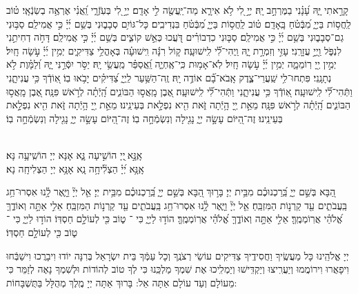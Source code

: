 \documentclass[twoside, openany, parskip=half, 11pt]{book}
\begin{document}
{
 קָרָ֣אתִי יָּ֑הּ עָ֝נָ֗נִי בַמֶּרְחָ֣ב יָֽהּ׃ 
יְיָ֣ לִ֭י לֹ֥א אִירָ֑א מַה־יַּֽעֲשֶׂ֖ה לִ֣י אָדָֽם׃ 
יְיָ֣ לִ֭י בְּעֹֽזְֿרָ֑י וַֽ֝אֲנִ֗י אֶרְאֶ֥ה בְשֽׂנְֿאָֽי׃ 
ט֗וֹב לַֽחֲס֥וֹת בַּיְיָ֑ מִ֝בְּֿטֹ֗חַ בָּֽאָדָֽם׃ 
ט֗וֹב לַֽחֲס֥וֹת בַּיְיָ֑ מִ֝בְּֿטֹ֗חַ בִּנְדִיבִֽים׃ 
כָּל־גּוֹיִ֥ם סְבָב֑וּנִי בְּשֵׁ֥ם יְ֜יָ֗ כִּ֣י אֲמִילַֽם׃ 
סַבּ֥וּנִי גַם־סְבָב֑וּנִי בְּשֵׁ֥ם יְ֜יָ֗ כִּ֣י אֲמִילַֽם׃ 
סַבּ֤וּנִי כִדְבוֹרִ֗ים דֹּֽ֭עֲכוּ כְּאֵ֣שׁ קוֹצִ֑ים 
בְּשֵׁ֥ם יְ֜יָ֗ כִּ֣י אֲמִילַֽם׃ 
דָּחֹ֣ה דְחִיתַ֣נִי לִנְפֹּ֑ל וַ֖יְיָ֣ עֲזָרָֽנִי׃ 
עָזִּ֣י וְזִמְרָ֣ת יָ֑הּ וַֽיְהִי־לִ֝֗י לִֽישׁוּעָֽה׃ 
ק֤וֹל רִנָּ֬ה וִֽישׁוּעָ֗ה בְּאָהֳלֵ֥י צַדִּיקִ֑ים יְמִ֥ין יְ֜יָ֗ עֹ֣שָׂה חָֽיִל׃ 
יְמִ֣ין יְ֖יָ רֽוֹמֵמָ֑ה יְמִ֥ין יְ֜יָ֗ עֹ֣שָׂה חָֽיִל׃ 
לֹֽא־אָמ֥וּת כִּֽי־אֶֽחְיֶ֑ה וַֽ֝אֲסַפֵּ֗ר מַֽעֲשֵׂ֥י יָֽהּ׃ 
יַסֹּ֣ר יִסְּֿרַ֣נִּי יָּ֑הּ וְ֝לַמָּ֗וֶת לֹ֣א נְתָנָֽנִי׃ 
 פִּתְחוּ־לִ֥י שַֽׁעֲרֵי־צֶ֑דֶק אָֽבֹא־בָ֝֗ם אוֹדֶ֥ה יָֽהּ׃ 
זֶֽה־הַשַּׁ֥עַר לַֽיְיָ֑ צַ֝דִּיקִ֗ים יָבֹ֥אוּ בֽוֹ׃
אֽ֭וֹדְֿךָ כִּ֥י עֲנִיתָ֑נִי וַתְּֿהִי־לִ֝֗י לִֽישׁוּעָֽה׃ 
\scriptsize{אֽ֭וֹדְֿךָ כִּ֥י עֲנִיתָ֑נִי וַתְּֿהִי־לִ֝֗י לִֽישׁוּעָֽה׃} 
\normalsize{אֶ֭בֶן מָֽאֲס֣וּ הַבּוֹנִ֑ים הָֽ֝יְֿתָ֗ה לְרֹ֣אשׁ פִּנָּֽה׃}
\scriptsize{אֶ֭בֶן מָֽאֲס֣וּ הַבּוֹנִ֑ים הָֽ֝יְֿתָ֗ה לְרֹ֣אשׁ פִּנָּֽה׃} 
\normalsize{מֵאֵ֣ת יְ֖יָ הָ֥יְֿתָה זֹּ֑את הִ֖יא נִפְלָ֣את בְּעֵינֵֽינוּ׃} 
\scriptsize{מֵאֵ֣ת יְ֖יָ הָ֥יְֿתָה זֹּ֑את הִ֖יא נִפְלָ֣את בְּעֵינֵֽינוּ׃} 
\normalsize{זֶה־הַ֭יּוֹם עָשָׂ֣ה יְיָ֑ 	נָגִ֖ילָה וְנִשְׂמְֿחָ֣ה בֽוֹ׃}
\scriptsize{זֶה־הַ֭יּוֹם עָשָׂ֣ה יְיָ֑ נָגִ֖ילָה וְנִשְׂמְֿחָ֣ה בֽוֹ׃}
\normalsize{}

\\
 אָֽנָּ֣א ֖יְיָ הוֹשִׁ֣יעָה נָּ֑א \hfill אָנָּא יְיָ הוֹשִֽׁיעָ֥ה נָּא׃\\
 אָֽנָּ֥א יְ֝יָ֗ הַצְלִ֘יחָ֥ה נָֽא \hfill אָנָּ֥א יְיָ הַצְלִיחָֽה נָא׃ 


  הַ֭בָּא בְּשֵׁ֣ם יְיָ֑ בֵּֽ֝רַכְנוּכֶ֗ם מִבֵּ֥ית יְיָ׃ 
\scriptsize{בָּר֣וּךְ הַ֭בָּא בְּשֵׁ֣ם יְיָ֑ בֵּֽ֝רַכְנוּכֶ֗ם מִבֵּ֥ית יְיָ׃}
\normalsize{אֵ֤ל יְיָ֘ וַיָּ֢אֶר לָ֥֫נוּ אִסְרוּ־חַ֥ג בַּֽעֲבֹתִ֑ים עַ֖ד קַרְנ֣וֹת הַמִּזְבֵּֽחַ׃}
\scriptsize{אֵ֤ל יְיָ֘ וַיָּ֢אֶר לָ֥֫נוּ אִסְרוּ־חַ֥ג בַּֽעֲבֹתִ֑ים עַ֖ד קַרְנ֣וֹת הַמִּזְבֵּֽחַ׃}
\normalsize{אֵלִ֣י אַתָּ֣ה וְאוֹדֶ֑ךָּ אֱ֝לֹהַ֗י אֲרֽוֹמְמֶֽךָּ׃}
\scriptsize{אֵלִ֣י אַתָּ֣ה וְאוֹדֶ֑ךָּ אֱ֝לֹהַ֗י אֲרֽוֹמְמֶֽךָּ׃}
\normalsize{הוֹד֣וּ לַיְיָ֑ כִּי ־ ט֑וֹב כִּ֖י לְעוֹלָ֣ם חַסְדּֽוֹ׃}
 \scriptsize{הוֹד֣וּ לַיְיָ֑ כִּי ־ ט֑וֹב כִּ֖י לְעוֹלָ֣ם חַסְדּֽוֹ׃} 
\normalsize{}

 יְיָ אֱלֹהֵֽינוּ כָּל מַעֲשֶֽׂיךָ וַחֲסִידֶֽיךָ צַדִּיקִים עוֹשֵׂי רְצֹנֶֽךָ וְכָל עַמְּֿךָ בֵּית יִשְׂרָאֵל בְּרִנָּה יוֹדוּ וִיבָרֲכוּ וִישַׁבְּֿחוּ וִיפָאֲרוּ וִירוֹמֲמוּ וְיַעֲרִֽיצוּ וְיַקְדִּֽישׁוּ וְיַמְלִֽיכוּ אֶת שִׁמְךָ מַלְכֵּֽנוּ  כִּי לְךָ טוֹב לְהוֹדוֹת וּלְשִׁמְךָ נָאֶה לְזַמֵּר כִּי מֵעוֹלָם וְעַד עוֹלָם אַתָּה אֵל: בָּרוּךְ אַתָּה יְיָ מֶֽלֶךְ מְהֻלָּל בַּתֻּשְׁבָּחוֹת:
}
\end{document}

